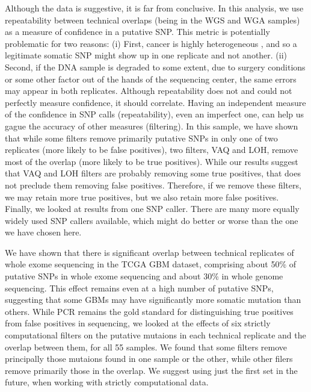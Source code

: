 \documentclass[11pt]{article} %
\begin{document}
Although the data is suggestive, it is far from conclusive. In this analysis, we use repeatability between technical overlaps (being in the WGS and WGA samples) as a measure of confidence in a putative SNP. This metric is potentially problematic for two reasons:
(i) First, cancer is highly heterogeneous \cite{hetero}, and so a legitimate somatic SNP might show up in one replicate and not another.
(ii) Second, if the DNA sample is degraded to some extent, due to surgery conditions or some other factor out of the hands of the sequencing center, the same errors may appear in both replicates. Although repeatability does not and could not perfectly measure confidence, it should correlate. Having an independent measure of the confidence in SNP calls (repeatability), even an imperfect one, can help us gague the accuracy of other measures (filtering).  
In this sample, we have shown that while some filters remove primarily putative SNPs in only one of two replicates (more likely to be false positives), two filters, VAQ and LOH, remove most of the overlap (more likely to be true positives). While our results suggest that VAQ and LOH filters are probably removing some true positives, that does not preclude them removing false positives. Therefore, if we remove these filters, we may retain more true positives, but we also retain more false positives.
Finally, we looked at results from one SNP caller. There are many more equally widely used SNP callers available, which might do better or worse than the one we have chosen here.

We have shown that there is significant overlap between technical replicates of whole exome sequencing in the TCGA GBM dataset, comprising about 50\% of putative SNPs in whole exome sequencing and about 30\% in whole genome sequencing. This effect remains even at a high number of putative SNPs, suggesting that some GBMs may have significantly more somatic mutation than others. While PCR remains the gold standard for distinguishing true positives from false positives in sequencing, we looked at the effects of six strictly computational filters on the putative mutaions in each technical replicate and the overlap between them, for all 55 samples. We found that some filters remove principally those mutaions found in one sample or the other, while other filers remove primarily those in the overlap. We suggest using just the first set in the future, when working with strictly computational data.
\end{document}
